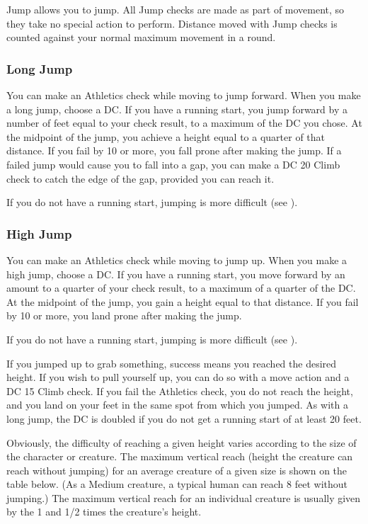Jump allows you to jump. All Jump checks are made as part of movement, so they take no special action to perform. Distance moved with Jump checks is counted against your normal maximum movement in a round. 

\subsubsection{Long Jump}
You can make an Athletics check while moving to jump forward. When you make a long jump, choose a DC. If you have a running start, you jump forward by a number of feet equal to your check result, to a maximum of the DC you chose. At the midpoint of the jump, you achieve a height equal to a quarter of that distance. If you fail by 10 or more, you fall prone after making the jump. If a failed jump would cause you to fall into a gap, you can make a DC 20 Climb check to catch the edge of the gap, provided you can reach it.

If you do not have a running start, jumping is more difficult (see ).

\subsubsection{High Jump}
You can make an Athletics check while moving to jump up. When you make a high jump, choose a DC. If you have a running start, you move forward by an amount to a quarter of your check result, to a maximum of a quarter of the DC. At the midpoint of the jump, you gain a height equal to that distance. If you fail by 10 or more, you land prone after making the jump.

If you do not have a running start, jumping is more difficult (see ).

If you jumped up to grab something, success means you reached the desired height. If you wish to pull yourself up, you can do so with a move action and a DC 15 Climb check. If you fail the Athletics check, you do not reach the height, and you land on your feet in the same spot from which you jumped. As with a long jump, the DC is doubled if you do not get a running start of at least 20 feet.

Obviously, the difficulty of reaching a given height varies according to the size of the character or creature. The maximum vertical reach (height the creature can reach without jumping) for an average creature of a given size is shown on the table below. (As a Medium creature, a typical human can reach 8 feet without jumping.) The maximum vertical reach for an individual creature is usually given by the 1 and 1/2 times the creature's height.

